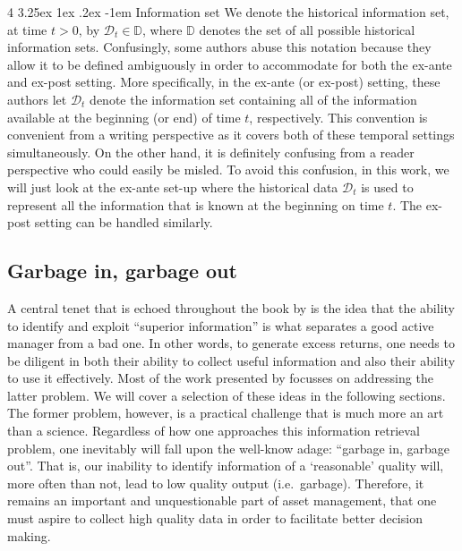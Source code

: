 \documentclass[12pt]{article}
\makeatletter
\renewcommand\paragraph{%
	\@startsection{paragraph}
	{4}
	{\z@}
	{3.25ex \@plus1ex \@minus.2ex}
	{-1em}
	{\normalfont\normalsize\bfseries\maybe@addperiod}%
}
\newcommand{\maybe@addperiod}[1]{%
	#1\@addpunct{.}%
}
\makeatother
\begin{document}
\paragraph{Information set} We denote the historical information set, at time $t > 0$, by $\mathcal{D}_t \in \mathbb{D}$, where $\mathbb{D}$ denotes the set of all possible historical information sets. Confusingly, some authors abuse this notation because they allow it to be defined ambiguously in order to accommodate for both the ex-ante and ex-post setting. More specifically, in the ex-ante (or ex-post) setting, these authors let $\mathcal{D}_t$ denote the information set containing all of the information available at the beginning (or end) of time $t$, respectively. This convention is convenient from a writing perspective as it covers both of these temporal settings simultaneously. On the other hand, it is definitely confusing from a reader perspective who could easily be misled. To avoid this confusion, in this work, we will just look at the ex-ante set-up where the historical data $\mathcal{D}_t$ is used to represent all the information that is known at the beginning on time $t$. The ex-post setting can be handled similarly.

\subsection{Garbage in, garbage out}
A central tenet that is echoed throughout the book by \cite{grinold1999} is the idea that the ability to identify and exploit ``superior information'' is what separates a good active manager from a bad one. In other words, to generate excess returns, one needs to be diligent in both their ability to collect useful information and also their ability to use it effectively. Most of the work presented by \cite{grinold1999} focusses on addressing the latter problem. We will cover a selection of these ideas in the following sections. The former problem, however, is a practical challenge that is much more an art than a science. Regardless of how one approaches this information retrieval problem, one inevitably will fall upon the well-know adage: ``garbage in, garbage out''. That is, our inability to identify information of a `reasonable' quality will, more often than not, lead to low quality output (i.e.\ garbage). Therefore, it remains an important and unquestionable part of asset management, that one must aspire to collect high quality data in order to facilitate better decision making.
\end{document}
